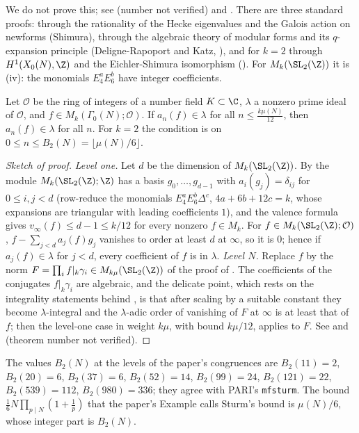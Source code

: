 We do not prove this; see \cite[Theorem 3.52]{Shimura71} (number not verified) and \cite[Section 6.5]{DiamondShurman}. There are three standard proofs: through the
rationality of the Hecke eigenvalues and the Galois action on newforms (Shimura), through the algebraic theory of modular forms and its $q$-expansion principle
(Deligne-Rapoport and Katz, \cite{DeligneRapoport73}), and for $k=2$ through $H^1(X_0(N),\Z)$ and the Eichler-Shimura isomorphism (). For $M_k(\SL_2(\Z))$ it is
(iv): the monomials $E_4^aE_6^b$ have integer coefficients.

\begin{theorem}\label{thm:modforms:sturm}
Let $\mathcal O$ be the ring of integers of a number field $K\subset\C$, $\lambda$ a nonzero prime ideal of $\mathcal O$, and $f\in M_k(\Gamma_0(N);\mathcal O)$. If $a_n(f)\in\lambda$ for all
$n\le\frac{k\mu(N)}{12}$, then $a_n(f)\in\lambda$ for all $n$. For $k=2$ the condition is on $0\le n\le B_2(N)=\lfloor\mu(N)/6\rfloor$.
\end{theorem}

\begin{proof}[Sketch of proof]
\emph{Level one.} Let $d$ be the dimension of $M_k(\SL_2(\Z))$. By  the module $M_k(\SL_2(\Z);\Z)$ has a basis $g_0,\dots,g_{d-1}$ with $a_i(g_j)=\delta_{ij}$ for
$0\le i,j<d$ (row-reduce the monomials $E_4^aE_6^b\Delta^c$, $4a+6b+12c=k$, whose expansions are triangular with leading coefficients $1$), and the valence formula gives
$v_\infty(f)\le d-1\le k/12$ for every nonzero $f\in M_k$. For $f\in M_k(\SL_2(\Z);\mathcal O)$, $f-\sum_{j<d}a_j(f)g_j$ vanishes to order at least $d$ at $\infty$, so it is $0$; hence if
$a_j(f)\in\lambda$ for $j<d$, every coefficient of $f$ is in $\lambda$. \emph{Level $N$.} Replace $f$ by the norm $F=\prod_if|_k\gamma_i\in M_{k\mu}(\SL_2(\Z))$ of the proof of
. The coefficients of the conjugates $f|_k\gamma_i$ are algebraic, and the delicate point, which rests on the integrality statements behind
, is that after scaling by a suitable constant they become $\lambda$-integral and the $\lambda$-adic order of vanishing of $F$ at $\infty$ is at least
that of $f$; then the level-one case in weight $k\mu$, with bound $k\mu/12$, applies to $F$. See \cite{Sturm87} and \cite[Chapter 9]{Stein} (theorem number not verified).
\end{proof}

The values $B_2(N)$ at the levels of the paper's congruences are $B_2(11)=2$, $B_2(20)=6$, $B_2(37)=6$, $B_2(52)=14$, $B_2(99)=24$, $B_2(121)=22$, $B_2(539)=112$,
$B_2(980)=336$; they agree with PARI's \texttt{mfsturm}. The bound $\frac16N\prod_{p\mid N}(1+\frac1p)$ that the paper's Example calls Sturm's bound is $\mu(N)/6$, whose integer part is $B_2(N)$.

